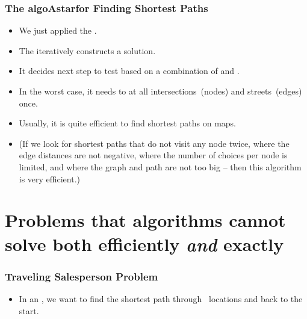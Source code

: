 \documentclass[aspectratio=169,mathserif,notheorems]{beamer}%
\begin{document}
\begin{frame}%
\frametitle{The \gls{algoAstar}for Finding Shortest Paths}%
\begin{itemize}%
%
\item We just applied the \cite{HNR1968AFBFTHDOMCP,P1997AAP}.%
%
\item<2-> The  iteratively constructs a solution.%
%
\item<3-> It decides next step to test based on a combination of {\color{path-green}{heuristic}} and {\color{path-red}{cost}}.%
%
\item<4-> In the worst case, it needs to  at all intersections~(nodes) and streets~(edges) once.%
%
\item<5-> Usually, it is quite efficient to find shortest paths on maps.%
%
\item<6-> (If we look for shortest paths that do not visit any node twice, where the edge distances are not negative, where the number of choices per node is limited, and where the graph and path are not too big -- then this algorithm is very efficient.)%
%
\end{itemize}%
\end{frame}%
%
\section{Problems that algorithms cannot solve both efficiently \emph{and} exactly}%
%
%
%
%
\begin{frame}[t]%
\frametitle{Traveling Salesperson Problem}%
%
\begin{itemize}%
\item In an , we want to find the shortest path through \scale~locations and back to the start\cite{ABCC2006TTSPACS,LLRKS1985TTSPAGTOCO,GP2002TTSPAIV,WCLTTCMY2014BOAAOSFFTTSP,LWLvdBTW2024ATTSPWFFAAHA,WWCTL2016GVLSTIOPSOEAP}.%
\end{itemize}%
%
%
%
%
%
%
%
%
%
%
%
%
\end{frame}%
%
\end{document}
